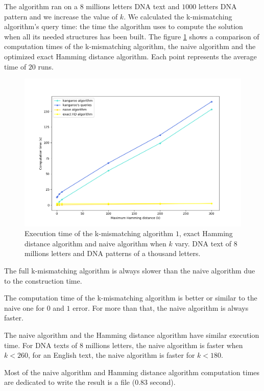 \documentclass[preprint,12pt]{elsarticle}
\begin{document}
The algorithm ran on a $8$ millions letters DNA text and $1 000$ letters DNA pattern
and we increase the value of $k$.
We calculated the k-mismatching algorithm's query time:
the time the algorithm uses to compute the solution when all its needed structures has been built.
The figure \ref{Kang} shows a comparison of computation times of
the k-mismatching algorithm, the naive algorithm and the optimized exact Hamming distance algorithm.
Each point represents the average time of $20$ runs.

\begin{figure}[h]
\centering
\includegraphics[scale=0.55]{./figures/Kang.png}
\caption{
Execution time of the k-mismatching algorithm $1$, exact Hamming distance algorithm and naive algorithm
when $k$ vary.
DNA text of $8$ millions letters and DNA patterns of a thousand letters.
}
\label{Kang}
\end{figure}


The full k-mismatching algorithm is always slower than the naive algorithm due to the construction time.

The computation time of the k-mismatching algorithm is better or similar to the naive one for $0$ and $1$ error.
For more than that, the naive algorithm is always faster.

The naive algorithm and the Hamming distance algorithm have similar execution time.
For DNA texts of $8$ millions letters, the naive algorithm is faster when $k < 260$,
for an English text, the naive algorithm is faster for $k < 180$. 

Most of the naive algorithm and Hamming distance algorithm computation times
are dedicated to write the result is a file ($0.83$ second).
\end{document}
